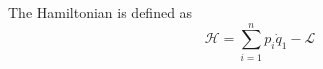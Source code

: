 \documentclass[../../../main.tex]{subfiles}
\begin{document}
The Hamiltonian is defined as 
\begin{equation*}
    \mathcal{H}=\sum_{i=1}^{n}p_i\dot{q}_1-\mathcal{L}
\end{equation*}
\end{document}
